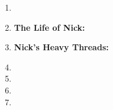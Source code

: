 \documentclass[11pt]{article}
\begin{document}
\begin{enumerate}
\item 

\item {\bf The Life of Nick:}
    

\pagebreak
\item {\bf Nick's Heavy Threads:}
	

\item 

\item 

\newpage
\item 

\item 


\end{enumerate}
\end{document}

